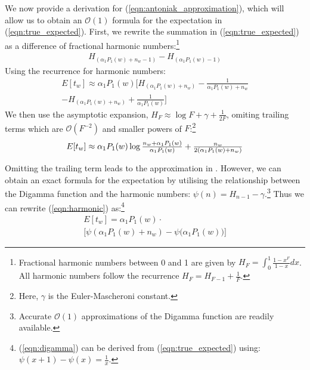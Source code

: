\documentclass[11pt]{article}
\begin{document}
We now provide a derivation for (\ref{eqn:antoniak_approximation}), which will allow us to obtain an  $\mathcal{O}(1)$ formula for the expectation in (\ref{eqn:true_expected}).  First, we rewrite the summation in (\ref{eqn:true_expected}) as a difference of fractional harmonic numbers:\footnote{Fractional harmonic numbers between 0 and 1 are given by $ H_F =\int_0^1 \frac{1 -x^F} {1 -x} dx$.  All harmonic numbers follow the recurrence $H_F = H_{F-1} + \frac{1}{F}$.}
\begin{align}
\label{eqn:harmonic}
 H_{(\alpha_1 P_1(w)+n_w-1)} - H_{(\alpha_1 P_1(w)-1)}
\end{align}
Using the recurrence for harmonic numbers:
\begin{multline}
\!\!\!\!\!\! E[t_w] \approx \alpha_1 P_1(w) \Big[ H_{(\alpha_1 P_1(w)+n_w)} - \frac{1}{\alpha_1 P_1(w)+n_w}\\  - H_{(\alpha_1 P_1(w) + n_w)} + \frac{1}{\alpha_1 P_1(w)} \Big ]
\end{multline}
We then use the asymptotic expansion, \mbox{$H_F \approx \log{F} + \gamma + \frac{1}{2F}$}, omiting trailing terms which are $\mathcal{O}(F^{-2})$ and smaller powers of $F$:\footnote{Here, $\gamma$ is the Euler-Mascheroni constant.}
\begin{equation*}
\mathsmaller{E[t_w] \approx \alpha_1 P_1(w) \log \frac{n_w + \alpha_1 P_1(w)}{\alpha_1 P_1(w)} + \frac{n_w}{2(\alpha_1 P_1(w)+n_w)}}
\end{equation*}

Omitting the trailing term leads to the approximation in .  
However, we can obtain an exact formula for the expectation by 
utilising the relationship between the Digamma function and the harmonic numbers: \mbox{$\psi(n) = H_{n-1} - \gamma$}.\footnote{Accurate $\mathcal{O}(1)$ approximations of the Digamma function are readily available.}
Thus we can rewrite (\ref{eqn:harmonic}) as:\footnote{(\ref{eqn:digamma}) can be derived from (\ref{eqn:true_expected}) using: $\psi(x+1) - \psi(x) = \frac{1}{x}$.}
\begin{multline}
E[t_w] = \alpha_1 P_1(w) \cdot \\
 \big [\psi{(\alpha_1 P_1(w)+n_w)} - \psi{(\alpha_1 P_1(w)}) \big ]
\label{eqn:digamma}
\end{multline}
\end{document}

